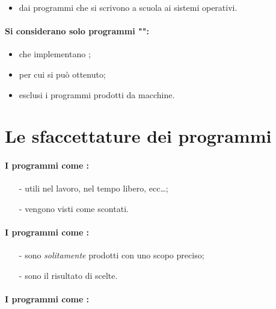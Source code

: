 \begin{itemize}
    \item dai programmi che si scrivono a scuola ai sistemi operativi.
\end{itemize}

\paragraph{Si considerano solo programmi "":}

\begin{itemize}
    \item che implementano ;
    \item per cui si può  ottenuto;
    \item esclusi i programmi prodotti da macchine.
\end{itemize}

\section{Le sfaccettature dei programmi}

\paragraph{I programmi come :}

\begin{itemize}
    \item [-] utili nel lavoro, nel tempo libero, ecc\dots;
    \item [-] vengono visti come scontati.
\end{itemize}

\paragraph{I programmi come :}

\begin{itemize}
    \item [-] sono \textit{solitamente} prodotti con uno scopo preciso;
    \item [-] sono il risultato di scelte.
\end{itemize}

\paragraph{I programmi come :}

